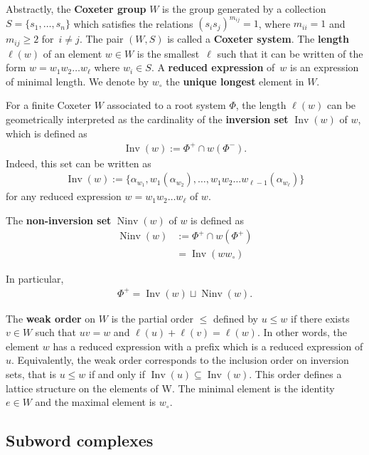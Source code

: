 \documentclass{amsart}
\theoremstyle{definition}
\DeclareMathOperator{\Inv}{Inv} %
\DeclareMathOperator{\Ninv}{Ninv} %
\newcommand{\defn}[1]{\textbf{\textsf{\color{PineGreen} #1}}} %
\newcommand{\cesar}[1]{\todo[color=orange!30,inline]{#1 \\ \hfill --- C.}}
\newcommand{\wo}{w_\circ} %
\begin{document}
Abstractly, the \defn{Coxeter group} $W$ is the group generated by a collection $S=\{s_1,\dots, s_n\}$ which satisfies the relations $(s_is_j)^{m_{ij}}=1$, where $m_{ii}=1$ and $m_{ij}\geq 2$ for~$i\neq j$.
The pair $(W,S)$ is called a \defn{Coxeter system}.
The \defn{length} $\ell(w)$ of an element $w\in W$ is the smallest~$\ell$ such that it can be written of the form $w=w_1w_2\dots w_\ell$ where $w_i\in S$. A \defn{reduced expression} of~$w$ is an expression of minimal length. 
We denote by $\wo$ the \defn{unique longest} element in $W$.

For a finite Coxeter $W$ associated to a root system $\Phi$, the length $\ell(w)$ can be geometrically interpreted as the cardinality of the \defn{inversion set} $\Inv(w)$ of $w$, which is defined as
\begin{align}\label{def_inversionset}
\Inv(w) := \Phi^+ \cap w(\Phi^-). 
\end{align}
Indeed, this set can be written as 
\begin{align}\label{def_inversionset2}
\Inv(w) := \{
\alpha_{w_1}, w_1(\alpha_{w_2}),\dots , w_1w_2\dots w_{\ell-1}(\alpha_{w_\ell})
\}
\end{align}
for any reduced expression $w=w_1w_2\dots w_\ell$ of $w$.

The \defn{non-inversion set} $\Ninv (w)$ of $w$ is defined as
\begin{align}
\Ninv(w) &:= \Phi^+ \cap w(\Phi^+) \label{def_noninversionset} \\
& =\Inv(w\wo)
\end{align}

In particular, 
\begin{align}
\Phi^+=\Inv(w) \sqcup \Ninv (w).
\end{align}

The \defn{weak order} on $W$ is the partial order $\leq$ defined by $u \leq w$ if there exists $v \in W$ such that $uv = w$ and $\ell(u) + \ell(v) = \ell(w)$. In other words, the element $w$ has a reduced expression with a prefix which is a reduced expression of $u$. Equivalently, the weak order corresponds to the inclusion order on inversion sets, that is $u \leq w$ if and only if $\Inv(u) \subseteq \Inv(w)$. This order defines a lattice structure on the elements of W. The minimal element is the identity $e \in W$ and the maximal element is $\wo$. 


\subsection{Subword complexes}
\end{document}
